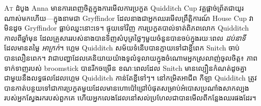 
\lettrine{A}{t} ដំបូង Anna មានការពេញចិត្តក្នុងការមើលការប្រកួត Quidditch Cup វគ្គផ្តាច់ព្រ័តជាយូរណាស់មកហើយ—ក្នុងនាមជា Gryffindor ដែលនាងជាអ្នកឈរមើលព្រឹត្តិការណ៍ House Cup វាមិនដូច Gryffindor ធ្លាប់ឈ្នះនោះទេ។ ផ្ទុយទៅវិញ ការប្រកួតបាល់ទាត់ពិភពលោក Quidditch កាលពីឆ្នាំមុន ដែលគ្រួសាររបស់នាងបានទិញសំបុត្រថ្លៃៗមួយចំនួនបានចប់ក្នុងរយៈពេល \emph{ដប់នាទី} ដែលមានតម្លៃ \emph{អាក្រក់}។ ហ្គេម Quidditch សម័យទំនើបបានក្លាយទៅជាខ្លីពេក Snitch ចាប់បានលឿនពេក។ វាជាបញ្ហាដែលគេនិយាយយ៉ាងទូលំទូលាយក្នុងចំណោមអ្នកស្រលាញ់ចូលចិត្ត៖ ភាពទាក់ទាញរបស់ broomstick បានរីកចម្រើន ខណៈពេលដែល Snitch មានល្បឿនកំណត់ដូចគ្នា ជាមួយនឹងលទ្ធផលដែលហ្គេម Quidditch កាន់តែខ្លីទៅៗ។ នៅកម្រិតអាជីព កីឡា Quidditch ត្រូវបានកាត់បន្ថយទៅជាការប្រកួតមួយដែលមានហោប៉ៅជ្រៅបំផុតសម្រាប់អំបោសប្រណាំងសាកល្បងរបស់អ្នកស្វែងរករបស់ពួកគេ ហើយអ្នកលេងដែលនៅសល់ប្រហែលជាបានមើលពីកន្លែងឈរផងដែរ។

